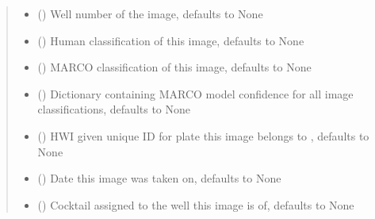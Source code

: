 \documentclass[letterpaper,10pt,english]{sphinxmanual}
\begin{document}
\begin{fulllineitems}
\begin{quote}
\begin{description}
\begin{itemize}
\item {} 
 (\sphinxstyleliteralemphasis{\sphinxupquote{, }}) \textendash{} Well number of the image, defaults to None

\item {} 
 (\sphinxstyleliteralemphasis{\sphinxupquote{, }}) \textendash{} Human classification of this image, defaults to None

\item {} 
 (\sphinxstyleliteralemphasis{\sphinxupquote{, }}) \textendash{} MARCO classification of this image, defaults to None

\item {} 
 (\sphinxstyleliteralemphasis{\sphinxupquote{, }}) \textendash{} Dictionary containing MARCO model confidence for
all image classifications, defaults to None

\item {} 
 (\sphinxstyleliteralemphasis{\sphinxupquote{, }}) \textendash{} HWI given unique ID for plate this image belongs to
, defaults to None

\item {} 
 (\sphinxstyleliteralemphasis{\sphinxupquote{, }}) \textendash{} Date this image was taken on, defaults to None

\item {} 
 ({\hyperref[\detokenize{polo.crystallography:polo.crystallography.cocktail.Cocktail}]{}}\sphinxstyleliteralemphasis{\sphinxupquote{, }}) \textendash{} Cocktail assigned to the well this image is of, defaults to None


\end{itemize}
\end{description}
\end{quote}
\end{fulllineitems}
\end{document}
